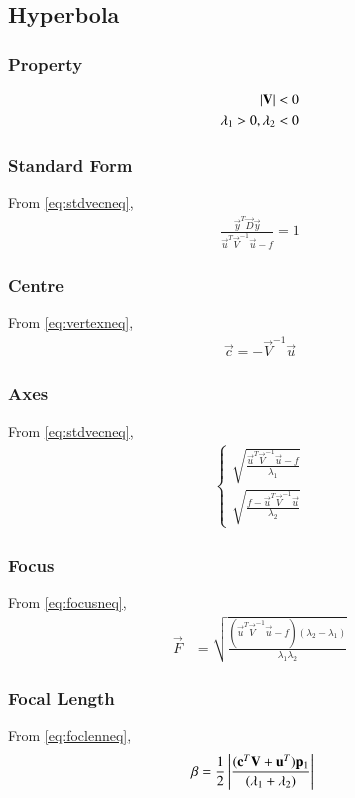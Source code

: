\documentclass[journal,12pt,twocolumn]{IEEEtran}
\begin{document}
\subsection{Hyperbola}
\subsubsection{Property}
\begin{align}
    \left\vert\mathbf{V}\right\vert < 0
    \\
    \lambda_1>0,\lambda_2<0
\end{align}
\subsubsection{Standard Form}
From \eqref{eq:stdvecneq},
\begin{align}
    \frac{\vec{y}^T\vec{D}\vec{y}}{\vec{u}^T\vec{V}^{-1}\vec{u}-f}=1
\end{align}
\subsubsection{Centre}
From \eqref{eq:vertexneq},
\begin{align}
    \vec{c} = -\vec{V}^{-1}\vec{u}
\end{align}
\subsubsection{Axes}
From \eqref{eq:stdvecneq},
\begin{align}
\begin{cases}
    \sqrt{\frac{\vec{u}^T\vec{V}^{-1}\vec{u}-f}{\lambda_1}}
    \\
    \sqrt{\frac{f-\vec{u}^T\vec{V}^{-1}\vec{u}}{\lambda_2}}
\end{cases}
\end{align}
\subsubsection{Focus}
From \eqref{eq:focusneq},
\begin{align}
    \vec{F} &= \sqrt{\frac{(\vec{u}^T\vec{V}^{-1}\vec{u}-f)(\lambda_2-\lambda_1)}{\lambda_1\lambda_2}}
\end{align}
\subsubsection{Focal Length}
From \eqref{eq:foclenneq},
\begin{align}
    \beta &= \frac{1}{2}\left\vert\frac{(\mathbf{c}^T\mathbf{V}+\mathbf{u}^T)\mathbf{p}_1}{(\lambda_1+\lambda_2)}\right\vert 
\end{align}
\end{document}
